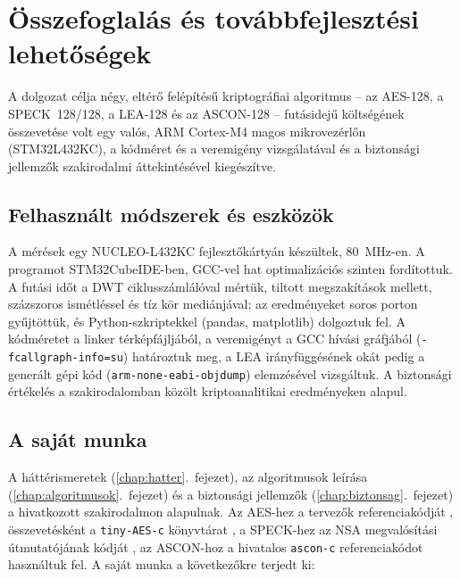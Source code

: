 \documentclass[a4paper,12pt]{report}
\theoremstyle{definition}
\theoremstyle{remark}
\begin{document}
\chapter{Összefoglalás és továbbfejlesztési lehetőségek}\label{chap:osszefoglalas}

A dolgozat célja négy, eltérő felépítésű kriptográfiai algoritmus -- az AES-128, a SPECK~128/128, a LEA-128 és az ASCON-128 -- futásidejű költségének összevetése volt egy valós, ARM Cortex-M4 magos mikrovezérlőn (STM32L432KC), a kódméret és a veremigény vizsgálatával és a biztonsági jellemzők szakirodalmi áttekintésével kiegészítve.

\section{Felhasznált módszerek és eszközök}

A mérések egy NUCLEO-L432KC fejlesztőkártyán készültek, 80~MHz-en. A programot STM32CubeIDE-ben, GCC-vel hat optimalizációs szinten fordítottuk. A futási időt a DWT ciklusszámlálóval mértük, tiltott megszakítások mellett, százszoros ismétléssel és tíz kör mediánjával; az eredményeket soros porton gyűjtöttük, és Python-szkriptekkel (pandas, matplotlib) dolgoztuk fel. A kódméretet a linker térképfájljából, a veremigényt a GCC hívási gráfjából (\texttt{-fcallgraph-info=su}) határoztuk meg, a LEA irányfüggésének okát pedig a generált gépi kód (\texttt{arm-none-eabi-objdump}) elemzésével vizsgáltuk. A biztonsági értékelés a szakirodalomban közölt kriptoanalitikai eredményeken alapul.

\section{A saját munka}

A háttérismeretek (\ref{chap:hatter}.~fejezet), az algoritmusok leírása (\ref{chap:algoritmusok}.~fejezet) és a biztonsági jellemzők (\ref{chap:biztonsag}.~fejezet) a hivatkozott szakirodalmon alapulnak. Az AES-hez a tervezők referenciakódját \cite{RijndaelFst}, összevetésként a \texttt{tiny-AES-c} könyvtárat \cite{TinyAES}, a SPECK-hez az NSA megvalósítási útmutatójának kódját \cite{Beaulieu2019}, az ASCON-hoz a hivatalos \texttt{ascon-c} referenciakódot \cite{AsconC} használtuk fel. A saját munka a következőkre terjedt ki:
\end{document}
